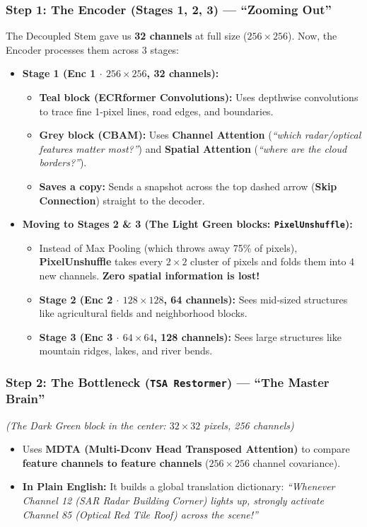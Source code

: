 \documentclass[11pt,a4paper]{article}
\begin{document}
\subsubsection*{Step 1: The Encoder (Stages 1, 2, 3) --- ``Zooming Out''}
The Decoupled Stem gave us \textbf{32 channels} at full size ($256 \times 256$). Now, the Encoder processes them across 3 stages:
\begin{itemize}[leftmargin=1.5em]
    \item \textbf{Stage 1 (Enc 1 $\cdot$ $256 \times 256$, 32 channels):}
    \begin{itemize}
        \item \textbf{Teal block (ECRformer Convolutions):} Uses depthwise convolutions to trace fine 1-pixel lines, road edges, and boundaries.
        \item \textbf{Grey block (CBAM):} Uses \textbf{Channel Attention} (\textit{``which radar/optical features matter most?''}) and \textbf{Spatial Attention} (\textit{``where are the cloud borders?''}).
        \item \textbf{Saves a copy:} Sends a snapshot across the top dashed arrow (\textbf{Skip Connection}) straight to the decoder.
    \end{itemize}
    \item \textbf{Moving to Stages 2 \& 3 (The Light Green blocks: \texttt{PixelUnshuffle}):}
    \begin{itemize}
        \item Instead of Max Pooling (which throws away 75\% of pixels), \textbf{PixelUnshuffle} takes every $2\times 2$ cluster of pixels and folds them into 4 new channels. \textbf{Zero spatial information is lost!}
        \item \textbf{Stage 2 (Enc 2 $\cdot$ $128 \times 128$, 64 channels):} Sees mid-sized structures like agricultural fields and neighborhood blocks.
        \item \textbf{Stage 3 (Enc 3 $\cdot$ $64 \times 64$, 128 channels):} Sees large structures like mountain ridges, lakes, and river bends.
    \end{itemize}
\end{itemize}

\subsubsection*{Step 2: The Bottleneck (\texttt{TSA Restormer}) --- ``The Master Brain''}
\textit{(The Dark Green block in the center: $32 \times 32$ pixels, 256 channels)}
\begin{itemize}[leftmargin=1.5em]
    \item Uses \textbf{MDTA (Multi-Dconv Head Transposed Attention)} to compare \textbf{feature channels to feature channels} ($256 \times 256$ channel covariance).
    \item \textbf{In Plain English:} It builds a global translation dictionary: \textit{``Whenever Channel 12 (SAR Radar Building Corner) lights up, strongly activate Channel 85 (Optical Red Tile Roof) across the scene!''}
\end{itemize}
\end{document}
